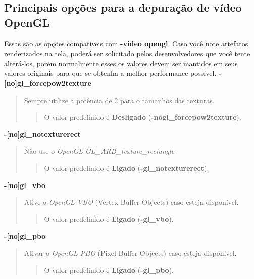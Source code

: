 \documentclass[letterpaper,10pt,brazil]{sphinxmanual}
\begin{document}
\subsection{Principais opções para a depuração de vídeo OpenGL}
\label{commandline/commandline-all:principais-opcoes-para-a-depuracao-de-video-opengl}
Essas são as opções compatíveis com \textbf{-video opengl}.
Caso você note artefatos renderizados na tela, poderá ser solicitado
pelos desenvolvedores que você tente alterá-los, porém normalmente esses
os valores devem ser mantidos em seus valores originais para que se
obtenha a melhor performance possível.
\label{commandline/commandline-all:mame-commandline-glforcepow2texture}
\textbf{-{[}no{]}gl\_forcepow2texture}
\begin{quote}

Sempre utilize a potência de 2 para o tamanhos das texturas.
\begin{quote}

O valor predefinido é \textbf{Desligado}
(\textbf{-nogl\_forcepow2texture}).
\end{quote}
\end{quote}
\label{commandline/commandline-all:mame-commandline-glnotexturerect}
\textbf{-{[}no{]}gl\_notexturerect}
\begin{quote}

Não use o \emph{OpenGL GL\_ARB\_texture\_rectangle}
\begin{quote}

O valor predefinido é \textbf{Ligado} (\textbf{-gl\_notexturerect}).
\end{quote}
\end{quote}
\label{commandline/commandline-all:mame-commandline-glvbo}
\textbf{-{[}no{]}gl\_vbo}
\begin{quote}

Ative o \emph{OpenGL VBO} (Vertex Buffer Objects) caso esteja disponível.
\begin{quote}

O valor predefinido é \textbf{Ligado} (\textbf{-gl\_vbo}).
\end{quote}
\end{quote}
\label{commandline/commandline-all:mame-commandline-glpbo}
\textbf{-{[}no{]}gl\_pbo}
\begin{quote}

Ativar o \emph{OpenGL PBO} (Pixel Buffer Objects) caso esteja disponível.
\begin{quote}

O valor predefinido é \textbf{Ligado} (\textbf{-gl\_pbo}).
\end{quote}
\end{quote}
\end{document}
